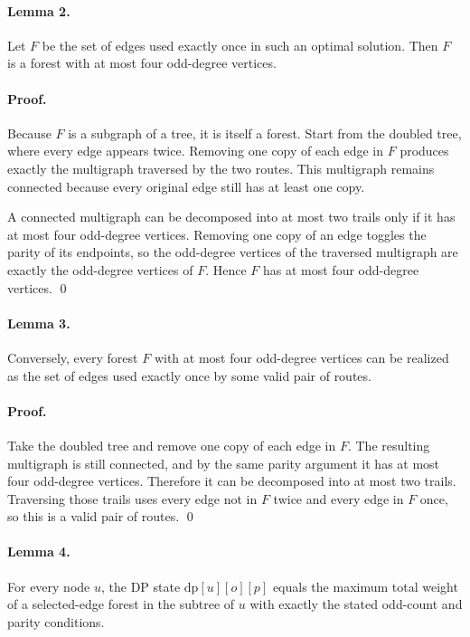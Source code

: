 \documentclass[11pt]{article}
\begin{document}
\paragraph{Lemma 2.}
Let $F$ be the set of edges used exactly once in such an optimal solution. Then $F$ is a forest with at most
four odd-degree vertices.

\paragraph{Proof.}
Because $F$ is a subgraph of a tree, it is itself a forest.
Start from the doubled tree, where every edge appears twice. Removing one copy of each edge in $F$
produces exactly the multigraph traversed by the two routes. This multigraph remains connected because
every original edge still has at least one copy.

A connected multigraph can be decomposed into at most two trails only if it has at most four odd-degree
vertices. Removing one copy of an edge toggles the parity of its endpoints, so the odd-degree vertices of
the traversed multigraph are exactly the odd-degree vertices of $F$. Hence $F$ has at most four odd-degree
vertices. \qed

\paragraph{Lemma 3.}
Conversely, every forest $F$ with at most four odd-degree vertices can be realized as the set of edges used
exactly once by some valid pair of routes.

\paragraph{Proof.}
Take the doubled tree and remove one copy of each edge in $F$. The resulting multigraph is still connected,
and by the same parity argument it has at most four odd-degree vertices. Therefore it can be decomposed
into at most two trails. Traversing those trails uses every edge not in $F$ twice and every edge in $F$ once,
so this is a valid pair of routes. \qed

\paragraph{Lemma 4.}
For every node $u$, the DP state $\mathrm{dp}[u][o][p]$ equals the maximum total weight of a selected-edge
forest in the subtree of $u$ with exactly the stated odd-count and parity conditions.
\end{document}
